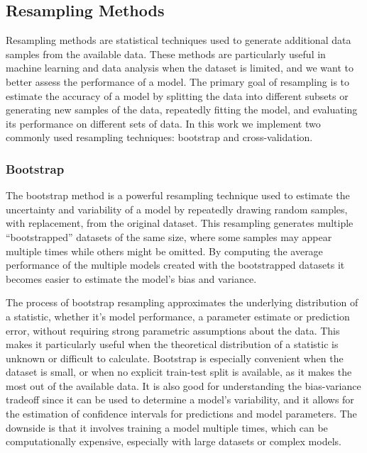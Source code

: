 \documentclass[aps,pra,english,notitlepage,reprint,nofootinbib]{revtex4-1}  %
\begin{document}
\vspace*{-2.5pt}
\subsection{Resampling Methods}
\vspace*{-2.5pt}
Resampling methods are statistical techniques used to generate additional data samples from the available data. These methods are particularly useful in machine learning and data analysis when the dataset is limited, and we want to better assess the performance of a model. The primary goal of resampling is to estimate the accuracy of a model by splitting the data into different subsets or generating new samples of the data, repeatedly fitting the model, and evaluating its performance on different sets of data. In this work we implement two commonly used resampling techniques: bootstrap and cross-validation.

\vspace*{-2.5pt}
\subsubsection{Bootstrap}
\vspace*{-2.5pt}
The bootstrap method is a powerful resampling technique used to estimate the uncertainty and variability of a model by repeatedly drawing random samples, with replacement, from the original dataset. This resampling generates multiple ``bootstrapped'' datasets of the same size, where some samples may appear multiple times while others might be omitted. By computing the average performance of the multiple models created with the bootstrapped datasets it becomes easier to estimate the model's bias and variance.

The process of bootstrap resampling approximates the underlying distribution of a statistic, whether it's model performance, a parameter estimate or prediction error, without requiring strong parametric assumptions about the data. This makes it particularly useful when the theoretical distribution of a statistic is unknown or difficult to calculate. Bootstrap is especially convenient when the dataset is small, or when no explicit train-test split is available, as it makes the most out of the available data. It is also good for understanding the bias-variance tradeoff since it can be used to determine a model's variability, and it allows for the estimation of confidence intervals for predictions and model parameters. The downside is that it involves training a model multiple times, which can be computationally expensive, especially with large datasets or complex models.
\end{document}

